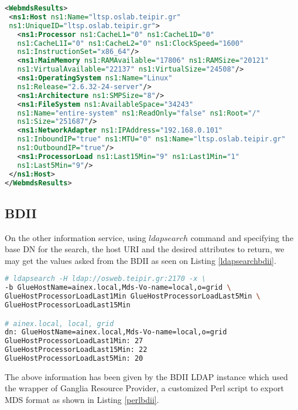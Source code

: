 \begin{lstlisting}[language=XML,caption=WebMDS results from XPath query,label=xpath_result]
<WebmdsResults>
 <ns1:Host ns1:Name="ltsp.oslab.teipir.gr" 
 ns1:UniqueID="ltsp.oslab.teipir.gr">
   <ns1:Processor ns1:CacheL1="0" ns1:CacheL1D="0" 
   ns1:CacheL1I="0" ns1:CacheL2="0" ns1:ClockSpeed="1600" 
   ns1:InstructionSet="x86_64"/>
   <ns1:MainMemory ns1:RAMAvailable="17806" ns1:RAMSize="20121" 
   ns1:VirtualAvailable="22137" ns1:VirtualSize="24508"/>
   <ns1:OperatingSystem ns1:Name="Linux" 
   ns1:Release="2.6.32-24-server"/>
   <ns1:Architecture ns1:SMPSize="8"/>
   <ns1:FileSystem ns1:AvailableSpace="34243" 
   ns1:Name="entire-system" ns1:ReadOnly="false" ns1:Root="/" 
   ns1:Size="251687"/>
   <ns1:NetworkAdapter ns1:IPAddress="192.168.0.101" 
   ns1:InboundIP="true" ns1:MTU="0" ns1:Name="ltsp.oslab.teipir.gr" 
   ns1:OutboundIP="true"/>
   <ns1:ProcessorLoad ns1:Last15Min="9" ns1:Last1Min="1" 
   ns1:Last5Min="9"/>
 </ns1:Host>
</WebmdsResults>
\end{lstlisting}

\subsection{BDII}

On the other information service, using $ldapsearch$ command and specifying the base DN for the search, the host URI and the desired attributes to return, we may get the values asked from the BDII as seen on Listing \ref{ldapsearchbdii}.

\begin{lstlisting}[language=bash,caption=BDII LDAP search for Glue CE ProcessorLoad attributes,label=ldapsearchbdii]
# ldapsearch -H ldap://osweb.teipir.gr:2170 -x \
-b GlueHostName=ainex.local,Mds-Vo-name=local,o=grid \
GlueHostProcessorLoadLast1Min GlueHostProcessorLoadLast5Min \
GlueHostProcessorLoadLast15Min

# ainex.local, local, grid
dn: GlueHostName=ainex.local,Mds-Vo-name=local,o=grid
GlueHostProcessorLoadLast1Min: 27
GlueHostProcessorLoadLast15Min: 22
GlueHostProcessorLoadLast5Min: 20
\end{lstlisting}

The above information has been given by the BDII LDAP instance which used the wrapper of Ganglia Resource Provider, a customized Perl script to export MDS format as shown in Listing \ref{perlbdii}.

